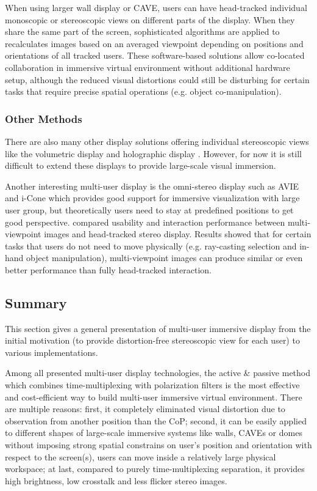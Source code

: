 When using larger wall display or CAVE, users can have head-tracked individual monoscopic \citep{Maksakov2010Whale} or stereoscopic views \citep{Schulze2012Democratizing} on different parts of the display. When they share the same part of the screen, sophisticated algorithms are applied to recalculates images based on an averaged viewpoint depending on positions and orientations of all tracked users. These software-based solutions allow co-located collaboration in immersive virtual environment without additional hardware setup, although the reduced visual distortions could still be disturbing for certain tasks that require precise spatial operations (e.g. object co-manipulation).

\subsubsection{Other Methods}
There are also many other display solutions offering individual stereoscopic views like the volumetric display \citep{Grossman2008Volum} and holographic display \citep{Lucente1997Holo}. However, for now it is still difficult to extend these displays to provide large-scale visual immersion. 

Another interesting multi-user display is the omni-stereo display \citep{Simon2004Omni} such as AVIE \citep{Mcginity2007Avie} and i-Cone \citep{Simon2002Icone} which provides good support for immersive visualization with large user group, but theoretically users need to stay at predefined positions to get good perspective. \citet{Simon2007MVI} compared usability and interaction performance between multi-viewpoint images and head-tracked stereo display. Results showed that for certain tasks that users do not need to move physically (e.g. ray-casting selection and in-hand object manipulation), multi-viewpoint images can produce similar or even better performance than fully head-tracked interaction.


\subsection{Summary}
This section gives a general presentation of multi-user immersive display from the initial motivation (to provide distortion-free stereoscopic view for each user) to various implementations.

Among all presented multi-user display technologies, the active \& passive method which combines time-multiplexing with polarization filters is the most effective and cost-efficient way to build multi-user immersive virtual environment. There are multiple reasons: first, it completely eliminated visual distortion due to observation from another position than the CoP; second,
it can be easily applied to different shapes of large-scale immersive systems like walls, CAVEs or domes without imposing strong spatial constrains on user's position and orientation with respect to the screen(s), users can move inside a relatively large physical workspace; at last, compared to purely time-multiplexing separation, it provides high brightness, low crosstalk and less flicker stereo images.   

